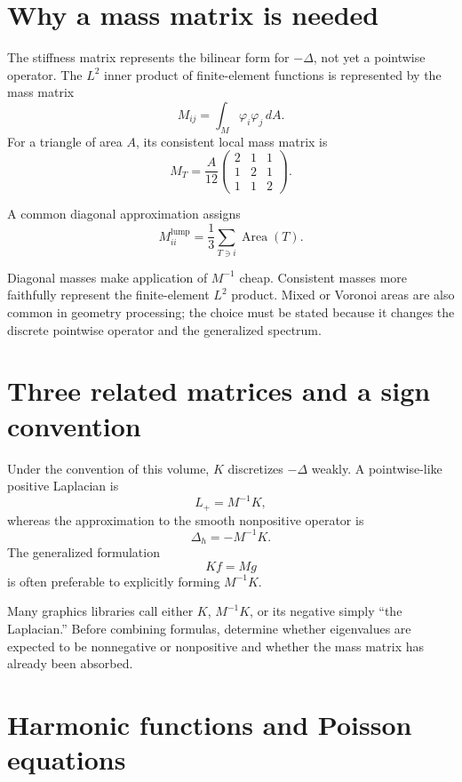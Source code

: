 \section{Why a mass matrix is needed}

The stiffness matrix represents the bilinear form for \(-\Delta\), not yet a
pointwise operator.  The \(L^2\) inner product of finite-element functions is
represented by the mass matrix
\[
M_{ij}=\int_M\varphi_i\varphi_j\,dA.
\]
For a triangle of area \(A\), its consistent local mass matrix is
\[
M_T=\frac{A}{12}
\begin{pmatrix}
2&1&1\\
1&2&1\\
1&1&2
\end{pmatrix}.
\]

\begin{definition}\label{def:vii41-lumped}
A common diagonal approximation assigns
\[
M_{ii}^{\mathrm{lump}}
=
\frac13\sum_{T\ni i}\operatorname{Area}(T).
\]
\end{definition}

Diagonal masses make application of \(M^{-1}\) cheap.  Consistent masses more
faithfully represent the finite-element \(L^2\) product.  Mixed or Voronoi
areas are also common in geometry processing; the choice must be stated because
it changes the discrete pointwise operator and the generalized spectrum.

\section{Three related matrices and a sign convention}

Under the convention of this volume, \(K\) discretizes \(-\Delta\) weakly.  A
pointwise-like positive Laplacian is
\[
L_+=M^{-1}K,
\]
whereas the approximation to the smooth nonpositive operator is
\[
\Delta_h=-M^{-1}K.
\]
The generalized formulation
\[
Kf=Mg
\]
is often preferable to explicitly forming \(M^{-1}K\).

\begin{warning}\label{warn:vii41-sign}
Many graphics libraries call either \(K\), \(M^{-1}K\), or its negative simply
``the Laplacian.''  Before combining formulas, determine whether eigenvalues are
expected to be nonnegative or nonpositive and whether the mass matrix has
already been absorbed.
\end{warning}

\section{Harmonic functions and Poisson equations}

